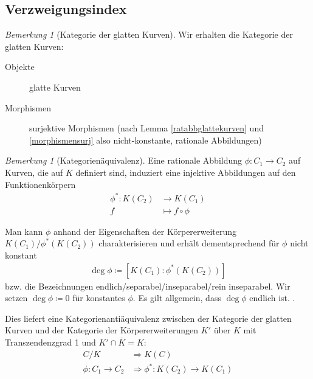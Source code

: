 \documentclass[english, german, parskip=half]{scrartcl}
\theoremstyle{definition}
\theoremstyle{remark}
\newtheorem{Bemerkung}[Satz]{Bemerkung}
\newcommand*{\K}{\ensuremath{K}} %
\newcommand*{\algK}{\ensuremath{\overline K}} %
\newcommand*{\longto}{\longrightarrow}
\begin{document}

\subsection{Verzweigungsindex}
\begin{Bemerkung}[Kategorie der glatten Kurven]
  Wir erhalten die Kategorie der glatten Kurven:
  \begin{description}
  \item[Objekte] glatte Kurven
  \item[Morphismen] surjektive Morphismen (nach Lemma
    \ref{ratabbglattekurven} und \ref{morphismensurj} also
    nicht-konstante, rationale Abbildungen)
  \end{description}
\end{Bemerkung}

\begin{Bemerkung}[Kategorienäquivalenz]\label{kategorienaequivalenz}
  Eine rationale Abbildung $\phi\colon C_1\to C_2$ auf Kurven, die auf
  $\K$ definiert sind,
  induziert eine injektive Abbildungen auf den Funktionenkörpern
  \begin{align*}
    \phi^* \colon \K(C_2) &\longto \K(C_1)\\
    f &\longmapsto f\circ \phi
  \end{align*}

  Man kann $\phi$ anhand der Eigenschaften der Körpererweiterung
  $\K(C_1)/\phi^*(\K(C_2))$ charakterisieren und erhält
  dementsprechend für $\phi$ nicht konstant
  \begin{gather*}
    \deg\phi \coloneqq \left[ \K(C_1) : \phi^*(\K(C_2)) \right]
  \end{gather*}
  bzw. die Bezeichnungen endlich/separabel/inseparabel/rein
  inseparabel.
  Wir setzen $\deg\phi\coloneqq 0$ für konstantes $\phi$.
  Es gilt allgemein, dass $\deg\phi$ endlich ist.
  \cite[siehe][Theorem 2.4 (a)]{silverman}.

  Dies liefert eine Kategorienantiäquivalenz zwischen der Kategorie der
  glatten Kurven und der Kategorie der Körpererweiterungen $\K'$ über $\K$
  mit Transzendenzgrad 1 und $\K'\cap\algK=\K$:
  \begin{align*}
    C/K &\Longrightarrow \K(C)\\
    \phi\colon C_1\to C_2 &\Longrightarrow \phi^*\colon\K(C_2)\to\K(C_1)
  \end{align*}
  
\end{Bemerkung}
\end{document}
